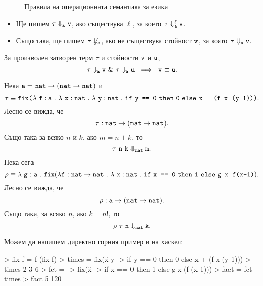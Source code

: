 \begin{figure}[H]
\begin{prooftree}
\end{prooftree}

\begin{prooftree}
\end{prooftree}
\caption{Правила на операционната семантика за езика \PCF}
\end{figure}



\begin{itemize}
\item 
  Ще пишем $\tau \Downarrow_{\vv{a}} \vv{v}$, ако съществува $\ell$, за което $\tau \Downarrow^\ell_{\vv{a}} \vv{v}$.  
\item
  Също така, ще пишем $\tau \not\Downarrow_{\vv{a}}$, ако не съществува стойност $\vv{v}$, за която $\tau \Downarrow_{\vv{a}} \vv{v}$.  
\end{itemize}

\begin{lemma}
  За произволен затворен терм $\tau$ и стойности $\vv{v}$ и $\vv{u}$,
  \[\tau \Downarrow_{\vv{a}} \vv{v}\ \&\ \tau \Downarrow_{\vv{a}} \vv{u}\ \implies\ \vv{v} \equiv \vv{u}.\]
\end{lemma}


\begin{example}
  Нека $\vv{a} = \vv{nat} \to (\vv{nat} \to \vv{nat})$ и 
  \[\tau \equiv \fix\vv{(}\lamb{f}{a}{\lamb{x}{nat}{\lamb{y}{nat}{\ifelse{\vv{y == 0}}{\vv{0}}{\vv{x + (f x (y-1))} }}}}\vv{)}.\]
  Лесно се вижда, че
  \[\tau:\vv{nat} \to (\vv{nat} \to \vv{nat}).\]
  Също така за всяко $n$ и $k$, ако $m = n + k$, то
  \[\tau\ \vv{n}\ \vv{k} \Downarrow_{\vv{nat}} \vv{m}.\]
  Нека сега
  \[\rho \equiv \lamb{g}{a}{\fix(\lambda \vv{f} : \vv{nat}\to\vv{nat}\ .\ \lamb{x}{nat}{\ifelse{\vv{x == 0}}{\vv{1}}{\vv{g x f(x-1)}}}}).\]
  Лесно се вижда, че
  \[ \rho : \vv{a} \to (\vv{nat} \to \vv{nat}).\]
  Също така, за всяко $n$, ако $k = n!$, то
  \[ \rho\ \tau\ \vv{n} \Downarrow_{\vv{nat}} \vv{k}.\]
\end{example}


Можем да напишем директно горния пример и на хаскел:
\begin{haskellcode}
> fix f = f (fix f)
> times = fix(\f x y -> if y == 0 then 0 else x + (f x (y-1)))
> times 2 3
6
> fct = \g -> fix(\f x -> if x == 0 then 1 else g x (f (x-1)))
> fact = fct times
> fact 5
120
\end{haskellcode}

